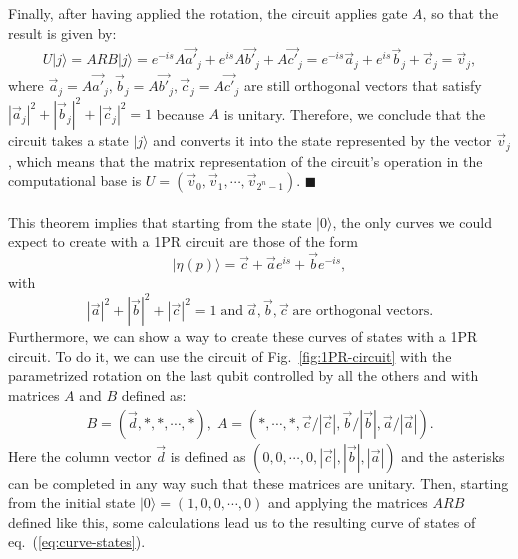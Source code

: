 \documentclass[10pt,letterpaper]{article} %
\newcommand{\fref}[1]{Fig.~\ref{#1}}
\newcommand{\eref}[1]{eq.~(\ref{#1})}
\begin{document}
Finally, after having applied the rotation, the circuit applies gate $A$, 
so that the result is given by:
\begin{eqnarray}
U|j\rangle = ARB|j\rangle = e^{-is} A \vec{a'}_j + e^{is} A \vec{b'}_j + A \vec{c'}_j = e^{-is} \vec{a}_j + e^{is} \vec{b}_j + \vec{c}_j = \vec{v}_j,
\end{eqnarray}
where $\vec{a}_j = A \vec{a'}_j , \vec{b}_j = A \vec{b'}_j , \vec{c}_j = A \vec{c'}_j$ are still orthogonal
vectors that satisfy $|\vec{a}_j|^2 + |\vec{b}_j|^2 + |\vec{c}_j|^2 = 1$ because $A$ is unitary. 
Therefore, we conclude that the circuit takes a state $|j\rangle$ and converts it
 into the state represented by the vector $\vec{v}_j$, which means that the matrix representation of the circuit's operation in the 
computational base is
 $U = (\vec{v}_0, \vec{v}_1, \cdots, \vec{v}_{2^n-1})$. $\blacksquare$  \\
 $\;$ \\
 
This theorem implies that starting from the state $|0\rangle$,
the only curves we could expect to create
with a 1PR circuit are those of the form
\begin{equation}
|\eta(p)\rangle = \vec{c} + \vec{a} e^{is} + \vec{b} e^{-is},
\label{eq:curve-states}
\end{equation}
with 
\begin{equation}
|\vec{a}|^2 + |\vec{b}|^2 + |\vec{c}|^2 = 1  \; \text{and} \; \vec{a}, \vec{b}, \vec{c} \; \text{are orthogonal vectors}.
\label{eq:conditions-vecs}
\end{equation}
Furthermore, we can show a way to create these curves of states
with a 1PR circuit.
To do it, we can use the circuit of \fref{fig:1PR-circuit} with the parametrized
rotation on the last qubit controlled by all the others
and with matrices $A$ and $B$ defined as:
\begin{align*}
B = (\vec{d}, *,*, \cdots,*), \; 
A = (* , \cdots, *, \vec{c}/|\vec{c}|, \vec{b}/|\vec{b}|, \vec{a}/|\vec{a}|).
\end{align*}
Here the column vector $\vec{d}$ is defined as 
$(0,0, \cdots,0 ,|\vec{c}|, |\vec{b}|, |\vec{a}|)$
and the asterisks can be completed in any
way such that these matrices are unitary.
Then, starting from the initial state $|0\rangle = (1,0,0,\cdots,0)$
and applying the matrices $ARB$ defined
like this, some calculations lead us to 
the resulting curve of states
of \eref{eq:curve-states}.
\end{document}
